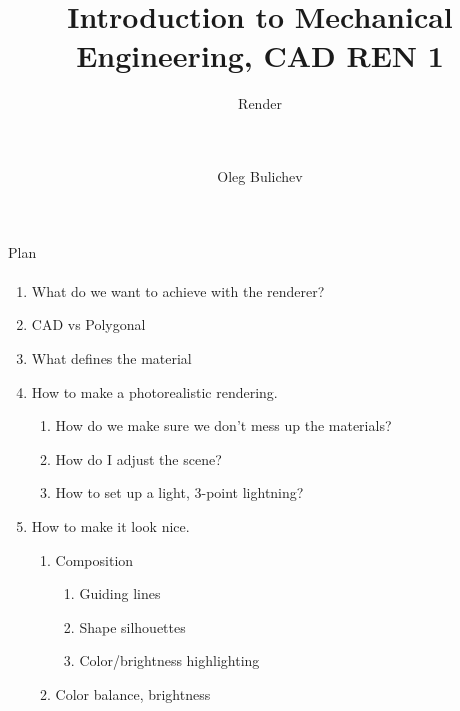 \documentclass[aspectratio=169]{beamer}
\title[IME]{Introduction to Mechanical Engineering, CAD REN 1} %
\subtitle{Render  
\\ \  
\\ \ 
    } %
\author{Oleg Bulichev}
\newcommand{\fbckg}[1]{\usebackgroundtemplate{\texttt{[image: \#1]}}}%
\begin{document}
\setlength{\abovedisplayskip}{0pt}
\setlength{\belowdisplayskip}{0pt}
\setlength{\abovedisplayshortskip}{0pt}
\setlength{\belowdisplayshortskip}{0pt}

\fbckg{fibeamer/figs/title_page.png}

\fbckg{fibeamer/figs/common.png}

\note{\scriptsize
}



\begin{frame}[t]{Plan}
\framesubtitle{}
\begin{enumerate}
    \scriptsize
    \item What do we want to achieve with the renderer?
    \item CAD vs Polygonal
    \item What defines the material
    \item How to make a photorealistic rendering.
    \begin{enumerate}
        \item How do we make sure we don't mess up the materials?
        \item How do I adjust the scene?
        \item How to set up a light, 3-point lightning?
    \end{enumerate}
    \item How to make it look nice. 
    \begin{enumerate}
        \item Composition
        \begin{enumerate}
            \item Guiding lines
            \item Shape silhouettes
            \item Color/brightness highlighting
        \end{enumerate}
        \item Color balance, brightness
    \end{enumerate}
\end{enumerate}
\end{frame}
\end{document}
